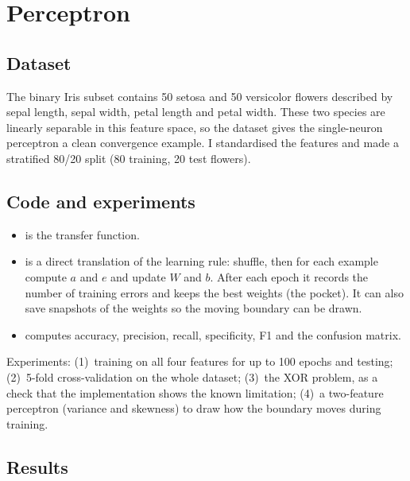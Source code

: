 \chapter{Perceptron}


\section{Dataset}
The binary Iris subset contains 50 setosa and 50 versicolor flowers described by sepal length, sepal
width, petal length and petal width. These two species are linearly separable in this feature space, so
the dataset gives the single-neuron perceptron a clean convergence example. I standardised the features
and made a stratified 80/20 split (80 training, 20 test flowers).

\section{Code and experiments}
\begin{itemize}
\item {} is the transfer function.
\item {} is a direct translation of the learning rule: shuffle, then for each example
      compute $a$ and $e$ and update $W$ and $b$. After each epoch it records the number of training
      errors and keeps the best weights (the pocket). It can also save snapshots of the weights so the
      moving boundary can be drawn.
\item {} computes accuracy, precision, recall, specificity, F1 and the confusion matrix.
\end{itemize}
\noindent Experiments: (1)~training on all four features for up to 100 epochs and testing;
(2)~5-fold cross-validation on the whole dataset; (3)~the XOR problem, as a check that the
implementation shows the known limitation; (4)~a two-feature perceptron (variance and skewness) to draw
how the boundary moves during training.

\section{Results}

